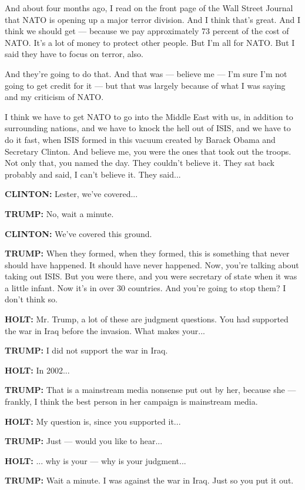 And about four months ago, I read on the front page of the Wall Street
Journal that NATO is opening up a major terror division. And I think
that's great. And I think we should get --- because we pay approximately
73 percent of the cost of NATO. It's a lot of money to protect other
people. But I'm all for NATO. But I said they have to focus on terror,
also.

And they're going to do that. And that was --- believe me --- I'm sure
I'm not going to get credit for it --- but that was largely because of
what I was saying and my criticism of NATO.

I think we have to get NATO to go into the Middle East with us, in
addition to surrounding nations, and we have to knock the hell out of
ISIS, and we have to do it fast, when ISIS formed in this vacuum created
by Barack Obama and Secretary Clinton. And believe me, you were the ones
that took out the troops. Not only that, you named the day. They
couldn't believe it. They sat back probably and said, I can't believe
it. They said...

\textbf{CLINTON:} Lester, we've covered...

\textbf{TRUMP:} No, wait a minute.

\textbf{CLINTON:} We've covered this ground.

\textbf{TRUMP:} When they formed, when they formed, this is something
that never should have happened. It should have never happened. Now,
you're talking about taking out ISIS. But you were there, and you were
secretary of state when it was a little infant. Now it's in over 30
countries. And you're going to stop them? I don't think so.

\textbf{HOLT:} Mr. Trump, a lot of these are judgment questions. You had
supported the war in Iraq before the invasion. What makes your...

\textbf{TRUMP:} I did not support the war in Iraq.

\textbf{HOLT:} In 2002...

\textbf{TRUMP:} That is a mainstream media nonsense put out by her,
because she --- frankly, I think the best person in her campaign is
mainstream media.

\textbf{HOLT:} My question is, since you supported it...

\textbf{TRUMP:} Just --- would you like to hear...

\textbf{HOLT:} ... why is your --- why is your judgment...

\textbf{TRUMP:} Wait a minute. I was against the war in Iraq. Just so
you put it out.

